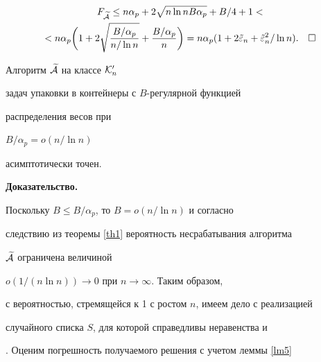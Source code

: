\begin{multline*}


F_{\widetilde {\cal A}} \le


n \alpha _{p} + 2\sqrt {n \ln nB\alpha _{p}} + B/4 + 1 < \\


%


<n \alpha _{p} \biggl(


1 + 2\sqrt { \frac {B/\alpha _{p}}{n/ \ln n} } +


\frac {B/\alpha _{p}}{n}\biggr) =


n\alpha_{p} (1+2\Tilde {\varepsilon }_{n}+


{\Tilde {\varepsilon }_{n}}^{2}/\ln n).\quad\square


\end{multline*}





\begin{thm}


\label{th3}


Алгоритм $\widetilde { \cal A}$ на классе ${\cal K}_n'$


задач упаковки в контейнеры с $B$-регулярной функцией


распределения весов при


$B/ \alpha _{p} = o(n/ \ln n)$


асимптотически точен.


\end{thm}





{\bf Доказательство.}


Поскольку $B \le B/ \alpha _{p} $, то $B=o(n/ \ln n)$ и согласно


следствию из теоремы \ref{th1} вероятность несрабатывания алгоритма


$\widetilde{ \cal A}$ ограничена величиной


$o(1/(n \ln n)) \to 0$ при $n \to \infty.$ Таким образом,


с вероятностью, стремящейся к 1 с ростом $n$, имеем дело с реализацией


случайного списка $S$, для которой справедливы неравенства  и


. Оценим погрешность получаемого решения с учетом леммы \ref {lm5}


